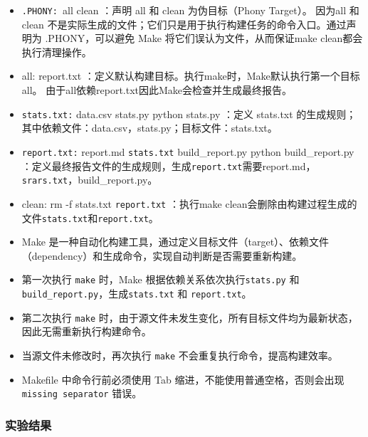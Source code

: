 \documentclass[UTF8,a4paper,11pt]{ctexart}
\begin{document}
\begin{itemize}[leftmargin=2em,itemsep=0.2em,topsep=0.3em]
    \small
    \item \texttt{.PHONY: }all clean ：声明 all 和 clean 为伪目标（Phony Target）。
        因为all 和 clean 不是实际生成的文件；它们只是用于执行构建任务的命令入口。通过声明为 .PHONY，可以避免 Make 将它们误认为文件，从而保证make clean都会执行清理操作。
    \item all: report.txt ：定义默认构建目标。执行make时，Make默认执行第一个目标all。
        由于all依赖report.txt因此Make会检查并生成最终报告。
    \item \texttt{stats.txt:} data.csv stats.py  python stats.py ：定义 stats.txt 的生成规则；其中依赖文件：data.csv，stats.py；目标文件：stats.txt。
    \item \texttt{report.txt:} report.md \texttt{stats.txt} build\_report.py   python build\_report.py ：定义最终报告文件的生成规则，生成\texttt{report.txt}需要report.md，\texttt{srars.txt}，build\_report.py。
    \item clean:    rm -f stats.txt \texttt{report.txt} ：执行make clean会删除由构建过程生成的文件\texttt{stats.txt}和\texttt{report.txt}。

\end{itemize}


\begin{itemize}[leftmargin=2em,itemsep=0.2em,topsep=0.3em]
    \small
    \item Make 是一种自动化构建工具，通过定义目标文件（target）、依赖文件（dependency）和生成命令，实现自动判断是否需要重新构建。
    \item 第一次执行 \texttt{make} 时，Make 根据依赖关系依次执行\texttt{stats.py} 和 \texttt{build\_report.py}，生成\texttt{stats.txt} 和 \texttt{report.txt}。
    \item 第二次执行 \texttt{make} 时，由于源文件未发生变化，所有目标文件均为最新状态，因此无需重新执行构建命令。
    \item 当源文件未修改时，再次执行 \texttt{make} 不会重复执行命令，提高构建效率。
    \item Makefile 中命令行前必须使用 Tab 缩进，不能使用普通空格，否则会出现 \texttt{missing separator} 错误。
\end{itemize}




\subsubsection{实验结果}
\end{document}
